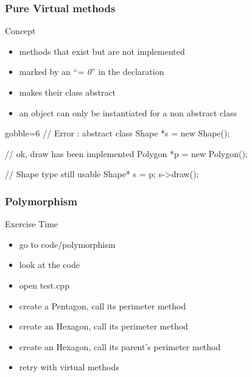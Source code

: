 \begin{frame}[fragile]
  \frametitle{Pure Virtual methods}
  \begin{block}{Concept}
    \begin{itemize}
    \item methods that exist but are not implemented
      \item marked by an ``{\it = 0}'' in the declaration
    \item makes their class abstract
    \item an object can only be instantiated for a non abstract class
    \end{itemize}
  \end{block}
  \pause
  \begin{multicols}{2}
    \begin{cppcode*}{gobble=6}
      // Error : abstract class
      Shape *s = new Shape();

      // ok, draw has been implemented
      Polygon *p = new Polygon();
      
      // Shape type still usable
      Shape* s = p;
      s->draw();
    \end{cppcode*}
    \columnbreak
    \center
  \end{multicols}
\end{frame}

\begin{frame}[fragile]
  \frametitle{Polymorphism}
  \begin{alertblock}{Exercise Time}
    \begin{itemize}
    \item go to code/polymorphism
    \item look at the code
    \item open test.cpp
    \item create a Pentagon, call its perimeter method
    \item create an Hexagon, call its perimeter method
    \item create an Hexagon, call its parent's perimeter method
    \item retry with virtual methods
    \end{itemize}
  \end{alertblock}
\end{frame}

